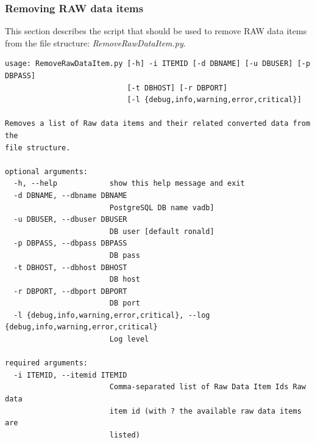 \subsubsection{Removing RAW data items}
\label{sec:removeraw}
This section describes the script that should be used to remove RAW data items from the file structure: \textit{RemoveRawDataItem.py}.
\begin{Verbatim}[fontfamily=courier,commandchars=\\\{\},fontsize=\footnotesize]
usage: RemoveRawDataItem.py [-h] -i ITEMID [-d DBNAME] [-u DBUSER] [-p DBPASS]
                            [-t DBHOST] [-r DBPORT]
                            [-l {debug,info,warning,error,critical}]

Removes a list of Raw data items and their related converted data from the
file structure.

optional arguments:
  -h, --help            show this help message and exit
  -d DBNAME, --dbname DBNAME
                        PostgreSQL DB name vadb]
  -u DBUSER, --dbuser DBUSER
                        DB user [default ronald]
  -p DBPASS, --dbpass DBPASS
                        DB pass
  -t DBHOST, --dbhost DBHOST
                        DB host
  -r DBPORT, --dbport DBPORT
                        DB port
  -l {debug,info,warning,error,critical}, --log {debug,info,warning,error,critical}
                        Log level

required arguments:
  -i ITEMID, --itemid ITEMID
                        Comma-separated list of Raw Data Item Ids Raw data
                        item id (with ? the available raw data items are
                        listed)
\end{Verbatim}

